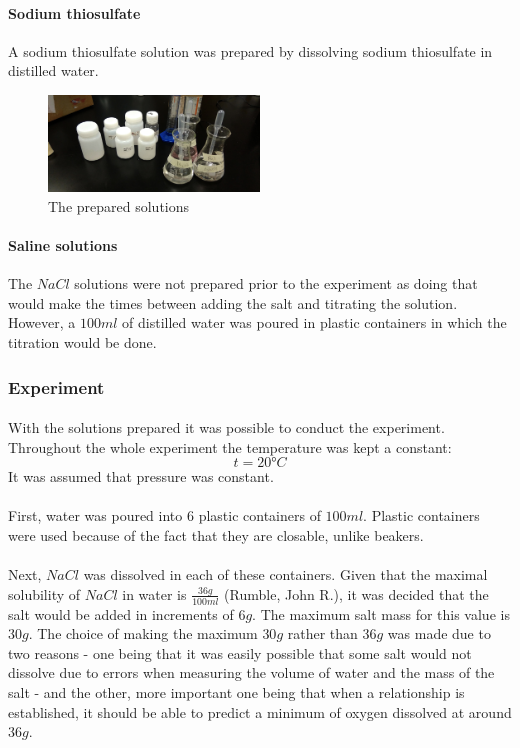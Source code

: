 \documentclass[a4paper]{article}
\begin{document}
\paragraph*{Sodium thiosulfate}
A sodium thiosulfate solution was prepared by dissolving sodium thiosulfate in
distilled water.

\begin{figure}[ht]
  \centering
  \includegraphics[width=0.5\textwidth]{img/solutions}
  \caption{The prepared solutions}
\end{figure}

\paragraph*{Saline solutions}
The $NaCl$ solutions were not prepared prior to the experiment as doing that
would make the times between adding the salt and titrating the solution.
However, a $100\si{ml}$ of distilled water was poured in plastic containers in
which the titration would be done.

\subsubsection{Experiment}

\paragraph*{}
With the solutions prepared it was possible to conduct the experiment.
Throughout the whole experiment the temperature was kept a constant:
$$t = 20\si{\degree C}$$
It was assumed that pressure was constant.

\paragraph*{}
First, water was poured into $6$ plastic containers of $100\si{ml}$. Plastic
containers were used because of the fact that they are closable, unlike
beakers.

\paragraph*{}
Next, $NaCl$ was dissolved in each of these containers. Given that the maximal
solubility of $NaCl$ in water is $\frac{36\si{g}}{100\si{ml}}$ (Rumble, John
R.), it was decided that the salt would be added in increments of $6\si{g}$.
The maximum salt mass for this value is $30 \si{g}$. The choice of making the
maximum $30\si{g}$ rather than $36\si{g}$ was made due to two reasons - one
being that it was easily possible that some salt would not dissolve due to
errors when measuring the volume of water and the mass of the salt - and the
other, more important one being that when a relationship is established, it
should be able to predict a minimum of oxygen dissolved at around $36\si{g}$.
\end{document}
